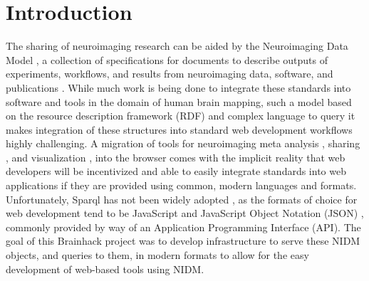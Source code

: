 \documentclass[twocolumn]{bmcart}%
\begin{document}
\section{Introduction}\label{introduction}
The sharing of neuroimaging research can be aided by the Neuroimaging Data Model \cite{noauthor_undated-jz} \cite{noauthor_undated-pr}, a collection of specifications for documents to describe outputs of experiments, workflows, and results from neuroimaging data, software, and publications \cite{noauthor_undated-jv}. While much work is being done to integrate these standards into software and tools in the domain of human brain mapping, such a model based on the resource description framework (RDF) \cite{noauthor_undated-hj} and complex language to query it \cite{noauthor_undated-cp} makes integration of these structures into standard web development workflows highly challenging. A migration of tools for neuroimaging meta analysis \cite{Yarkoni2011-rg}, sharing \cite{Gorgolewski2015-sf}, and visualization \cite{noauthor_undated-ca}, into the browser comes with the implicit reality that web developers will be incentivized and able to easily integrate standards into web applications if they are provided using common, modern languages and formats. Unfortunately, Sparql has not been widely adopted \cite{noauthor_undated-tz}, as the formats of choice for web development tend to be JavaScript and JavaScript Object Notation (JSON) \cite{Wikipedia_contributors2015-on}, commonly provided by way of an Application Programming Interface (API). The goal of this Brainhack project was to develop infrastructure to serve these NIDM objects, and queries to them, in modern formats to allow for the easy development of web-based tools using NIDM.
\end{document}
